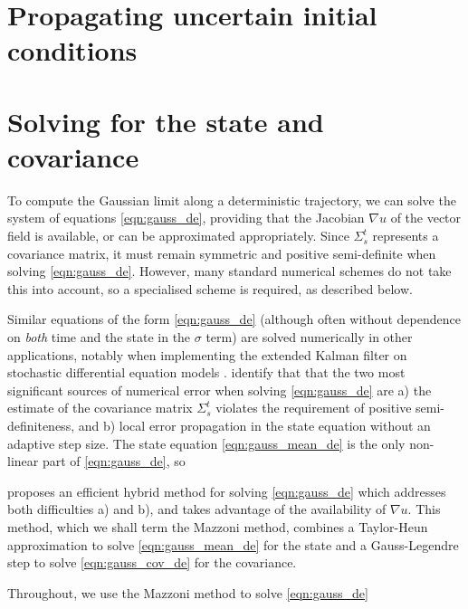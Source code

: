 \section{Propagating uncertain initial conditions}


\section{Solving for the state and covariance}
To compute the Gaussian limit along a deterministic trajectory, we can solve the system of equations \eqref{eqn:gauss_de}, providing that the Jacobian \(\nabla u\) of the vector field is available, or can be approximated appropriately.
Since \(\Sigma_s^t\) represents a covariance matrix, it must remain symmetric and positive semi-definite when solving \eqref{eqn:gauss_de}.
However, many standard numerical schemes do not take this into account, so a specialised scheme is required, as described below.

Similar equations of the form \eqref{eqn:gauss_de} (although often without dependence on \emph{both} time and the state in the \(\sigma\) term) are solved numerically in other applications, notably when implementing the extended Kalman filter on stochastic differential equation models \citep{Jazwinski_2014_StochasticProcessesFiltering, KulikovaKulikov_2014_AdaptiveODESolvers}.
\citet{KulikovaKulikov_2014_AdaptiveODESolvers} identify that that the two most significant sources of numerical error when solving \eqref{eqn:gauss_de} are a) the estimate of the covariance matrix \(\Sigma_s^t\) violates the requirement of positive semi-definiteness, and b) local error propagation in the state equation without an adaptive step size.
The state equation \eqref{eqn:gauss_mean_de} is the only non-linear part of \eqref{eqn:gauss_de}, so


\citet{Mazzoni_2008_ComputationalAspectsContinuous} proposes an efficient hybrid method for solving \eqref{eqn:gauss_de} which addresses both difficulties a) and b), and takes advantage of the availability of \(\nabla u\).
This method, which we shall term the Mazzoni method, combines a Taylor-Heun approximation to solve \eqref{eqn:gauss_mean_de} for the state and a Gauss-Legendre step to solve \eqref{eqn:gauss_cov_de} for the covariance.



Throughout, we use the Mazzoni method to solve \eqref{eqn:gauss_de}

